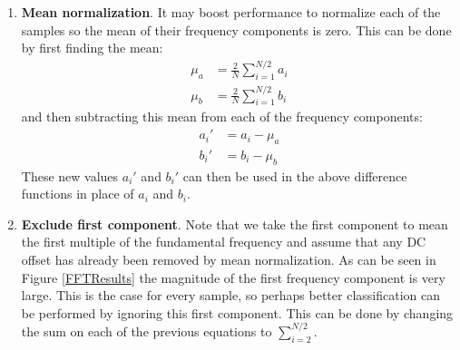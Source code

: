 \begin{enumerate}
	\item \textbf{Mean normalization}.
		It may boost performance to normalize each of the samples so the mean of their frequency components is zero.
		This can be done by first finding the mean:
		\begin{align}
			\mu_a &= \frac{2}{N} \sum_{i=1}^{N/2} a_i \\
			\mu_b &= \frac{2}{N} \sum_{i=1}^{N/2} b_i
		\end{align}
		and then subtracting this mean from each of the frequency components:
		\begin{align}
			a_i' &= a_i - \mu_a \\
			b_i' &= b_i - \mu_b
		\end{align}
		These new values $a_i'$ and $b_i'$ can then be used in the above difference functions in place of $a_i$ and $b_i$.
	
	\item \textbf{Exclude first component}.
		Note that we take the first component to mean the first multiple of the fundamental frequency and assume that any DC offset has already been removed
		by mean normalization.
		As can be seen in Figure \ref{FFTResults} the magnitude of the first frequency component is very large.
		This is the case for every sample, so perhaps better classification can be performed by ignoring this first component.
		This can be done by changing the sum on each of the previous equations to $\sum_{i=2}^{N/2}$.
\end{enumerate}

